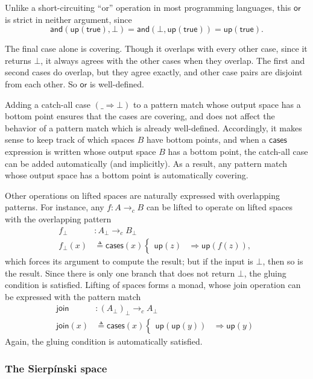 \documentclass[conference]{IEEEtran}
\newcommand{\cto}{\to_c}
\newcommand{\wildcard}{\_}
\newcommand{\Branch}{\Rightarrow}
\newcommand{\up}{\mathsf{up}}
\begin{document}
Unlike a short-circuiting ``or'' operation in most programming languages, this $\mathsf{or}$ is strict in neither argument, since
\[ 
\mathsf{and}(\mathsf{up}(\mathsf{true}), \bot) = 
\mathsf{and}(\bot, \mathsf{up}(\mathsf{true})) =
\mathsf{up}(\mathsf{true}).
\]

The final case alone is covering. Though it overlaps with every other case, since it returns $\bot$, it always agrees with the other cases when they overlap. The first and second cases do overlap, but they agree exactly, and other case pairs are disjoint from each other. So $\mathsf{or}$ is well-defined.

Adding a catch-all case $(\wildcard \Branch \bot)$ to a pattern match whose output space has a bottom point ensures that the cases are covering, and does not affect the behavior of a pattern match which is already well-defined. Accordingly, it makes sense to keep track of which spaces $B$ have bottom points, and when a $\mathsf{cases}$ expression is written whose output space $B$ has a bottom point, the catch-all case can be added automatically (and implicitly). As a result, any pattern match whose output space has a bottom point is automatically covering.

Other operations on lifted spaces are naturally expressed with overlapping patterns. For instance, any $f : A \cto B$ can be lifted to operate on lifted spaces with the overlapping pattern
\begin{align*}
f_\bot &: A_\bot \cto B_\bot
\\ f_\bot(x) &\triangleq
  \mathsf{cases}(x)
  \begin{cases}
  \up(z) &\Branch \up(f(z)),
  \end{cases}
\end{align*}
which forces its argument to compute the result; but if the input is $\bot$, then so is the result. Since there is only one branch that does not return $\bot$, the gluing condition is satisfied. Lifting of spaces forms a monad, whose join operation can be expressed with the pattern match
\begin{align*}
\mathsf{join} &: \left( A_\bot \right)_\bot \cto A_\bot
\\ \mathsf{join}(x) &\triangleq \mathsf{cases}(x)
\begin{cases}
\up(\up(y)) &\Branch \up(y)
\end{cases}
\end{align*}
Again, the gluing condition is automatically satisfied.

\subsubsection{The Sierp\'inski space}
\end{document}
